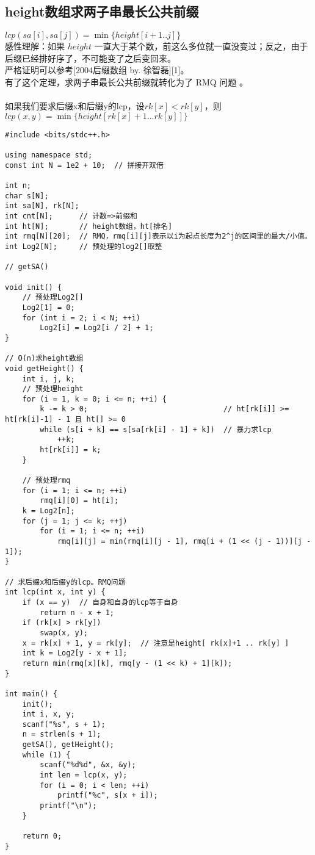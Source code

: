     \subsection{height数组求两子串最长公共前缀}
        $lcp(sa[i],sa[j])=\min\{height[i+1..j]\}$ \\
        感性理解：如果 $height$ 一直大于某个数，前这么多位就一直没变过；反之，由于后缀已经排好序了，不可能变了之后变回来。\\
        严格证明可以参考[$2004$后缀数组 by. 徐智磊][1]。\\
        有了这个定理，求两子串最长公共前缀就转化为了 RMQ 问题 。\\\\
        如果我们要求后缀x和后缀y的lcp，设$rk[x]<rk[y]$，则$lcp(x,y)=\min\{height[rk[x]+1\dots rk[y]]\}$
\begin{lstlisting}
#include <bits/stdc++.h>

using namespace std;
const int N = 1e2 + 10;  // 拼接开双倍

int n;
char s[N];
int sa[N], rk[N];
int cnt[N];      // 计数=>前缀和
int ht[N];       // height数组，ht[排名]
int rmq[N][20];  // RMQ，rmq[i][j]表示以i为起点长度为2^j的区间里的最大/小值。
int Log2[N];     // 预处理的log2[]取整

// getSA()

void init() {
    // 预处理Log2[]
    Log2[1] = 0;
    for (int i = 2; i < N; ++i)
        Log2[i] = Log2[i / 2] + 1;
}

// O(n)求height数组
void getHeight() {
    int i, j, k;
    // 预处理height
    for (i = 1, k = 0; i <= n; ++i) {
        k -= k > 0;                               // ht[rk[i]] >= ht[rk[i]-1] - 1 且 ht[] >= 0
        while (s[i + k] == s[sa[rk[i] - 1] + k])  // 暴力求lcp
            ++k;
        ht[rk[i]] = k;
    }

    // 预处理rmq
    for (i = 1; i <= n; ++i)
        rmq[i][0] = ht[i];
    k = Log2[n];
    for (j = 1; j <= k; ++j)
        for (i = 1; i <= n; ++i)
            rmq[i][j] = min(rmq[i][j - 1], rmq[i + (1 << (j - 1))][j - 1]);
}

// 求后缀x和后缀y的lcp。RMQ问题
int lcp(int x, int y) {
    if (x == y)  // 自身和自身的lcp等于自身
        return n - x + 1;
    if (rk[x] > rk[y])
        swap(x, y);
    x = rk[x] + 1, y = rk[y];  // 注意是height[ rk[x]+1 .. rk[y] ]
    int k = Log2[y - x + 1];
    return min(rmq[x][k], rmq[y - (1 << k) + 1][k]);
}

int main() {
    init();
    int i, x, y;
    scanf("%s", s + 1);
    n = strlen(s + 1);
    getSA(), getHeight();
    while (1) {
        scanf("%d%d", &x, &y);
        int len = lcp(x, y);
        for (i = 0; i < len; ++i)
            printf("%c", s[x + i]);
        printf("\n");
    }

    return 0;
}
\end{lstlisting}
